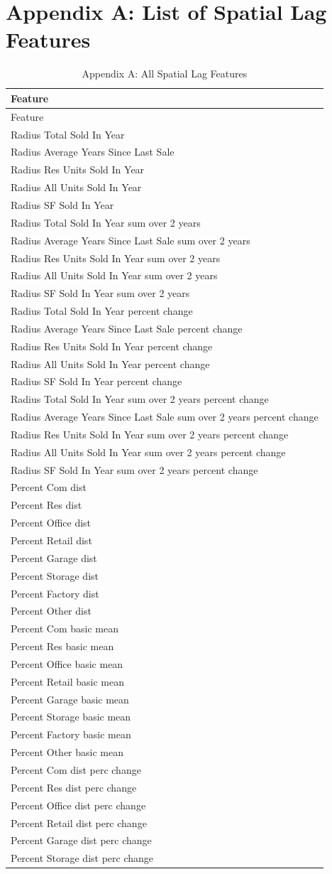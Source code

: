 \documentclass[]{article}
\begin{document}
\section{Appendix A: List of Spatial Lag
Features}\label{appendix-a-list-of-spatial-lag-features}

\begin{longtable}[]{@{}l@{}}
\caption{Appendix A: All Spatial Lag Features}\tabularnewline
\toprule
Feature\tabularnewline
\midrule
\endfirsthead
\toprule
Feature\tabularnewline
\midrule
\endhead
Radius Total Sold In Year\tabularnewline
Radius Average Years Since Last Sale\tabularnewline
Radius Res Units Sold In Year\tabularnewline
Radius All Units Sold In Year\tabularnewline
Radius SF Sold In Year\tabularnewline
Radius Total Sold In Year sum over 2 years\tabularnewline
Radius Average Years Since Last Sale sum over 2 years\tabularnewline
Radius Res Units Sold In Year sum over 2 years\tabularnewline
Radius All Units Sold In Year sum over 2 years\tabularnewline
Radius SF Sold In Year sum over 2 years\tabularnewline
Radius Total Sold In Year percent change\tabularnewline
Radius Average Years Since Last Sale percent change\tabularnewline
Radius Res Units Sold In Year percent change\tabularnewline
Radius All Units Sold In Year percent change\tabularnewline
Radius SF Sold In Year percent change\tabularnewline
Radius Total Sold In Year sum over 2 years percent change\tabularnewline
Radius Average Years Since Last Sale sum over 2 years percent
change\tabularnewline
Radius Res Units Sold In Year sum over 2 years percent
change\tabularnewline
Radius All Units Sold In Year sum over 2 years percent
change\tabularnewline
Radius SF Sold In Year sum over 2 years percent change\tabularnewline
Percent Com dist\tabularnewline
Percent Res dist\tabularnewline
Percent Office dist\tabularnewline
Percent Retail dist\tabularnewline
Percent Garage dist\tabularnewline
Percent Storage dist\tabularnewline
Percent Factory dist\tabularnewline
Percent Other dist\tabularnewline
Percent Com basic mean\tabularnewline
Percent Res basic mean\tabularnewline
Percent Office basic mean\tabularnewline
Percent Retail basic mean\tabularnewline
Percent Garage basic mean\tabularnewline
Percent Storage basic mean\tabularnewline
Percent Factory basic mean\tabularnewline
Percent Other basic mean\tabularnewline
Percent Com dist perc change\tabularnewline
Percent Res dist perc change\tabularnewline
Percent Office dist perc change\tabularnewline
Percent Retail dist perc change\tabularnewline
Percent Garage dist perc change\tabularnewline
Percent Storage dist perc change\tabularnewline

\end{longtable}
\end{document}
